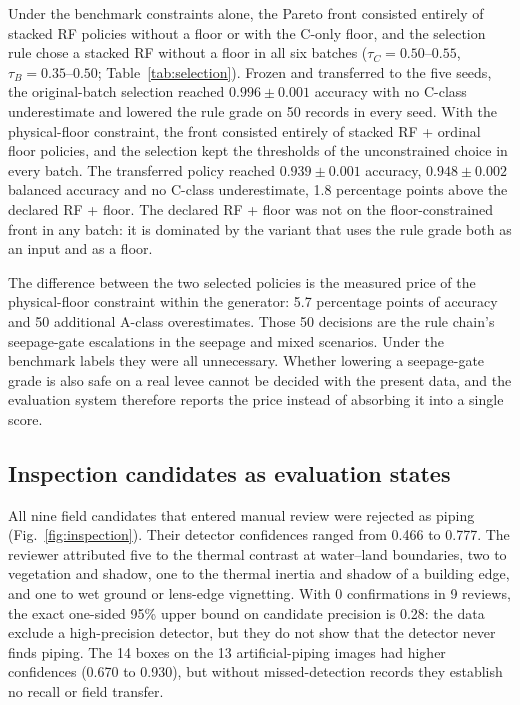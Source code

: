 \documentclass[journal]{IEEEtran}
\begin{document}
Under the benchmark constraints alone, the Pareto front consisted entirely of stacked RF policies without a floor or with the C-only floor, and the selection rule chose a stacked RF without a floor in all six batches ($\tau_C=0.50$--$0.55$, $\tau_B=0.35$--$0.50$; Table~\ref{tab:selection}). Frozen and transferred to the five seeds, the original-batch selection reached $0.996\pm0.001$ accuracy with no C-class underestimate and lowered the rule grade on 50 records in every seed. With the physical-floor constraint, the front consisted entirely of stacked RF + ordinal floor policies, and the selection kept the thresholds of the unconstrained choice in every batch. The transferred policy reached $0.939\pm0.001$ accuracy, $0.948\pm0.002$ balanced accuracy and no C-class underestimate, 1.8 percentage points above the declared RF + floor. The declared RF + floor was not on the floor-constrained front in any batch: it is dominated by the variant that uses the rule grade both as an input and as a floor.

The difference between the two selected policies is the measured price of the physical-floor constraint within the generator: 5.7 percentage points of accuracy and 50 additional A-class overestimates. Those 50 decisions are the rule chain's seepage-gate escalations in the seepage and mixed scenarios. Under the benchmark labels they were all unnecessary. Whether lowering a seepage-gate grade is also safe on a real levee cannot be decided with the present data, and the evaluation system therefore reports the price instead of absorbing it into a single score.

\subsection{Inspection candidates as evaluation states}
\label{sec:res-inspection}
All nine field candidates that entered manual review were rejected as piping (Fig.~\ref{fig:inspection}). Their detector confidences ranged from 0.466 to 0.777. The reviewer attributed five to the thermal contrast at water--land boundaries, two to vegetation and shadow, one to the thermal inertia and shadow of a building edge, and one to wet ground or lens-edge vignetting. With 0 confirmations in 9 reviews, the exact one-sided 95\% upper bound on candidate precision is 0.28: the data exclude a high-precision detector, but they do not show that the detector never finds piping. The 14 boxes on the 13 artificial-piping images had higher confidences (0.670 to 0.930), but without missed-detection records they establish no recall or field transfer.
\end{document}
